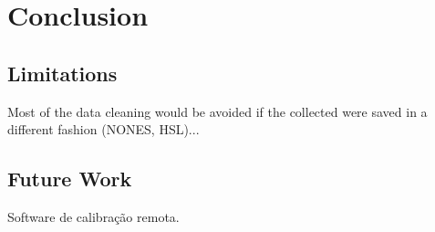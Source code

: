 
\chapter{Conclusion}
\label{chapter:conclusion}

\section{Limitations}
\label{sec:limitations}
Most of the data cleaning would be avoided if the collected were saved in a different fashion (NONES, HSL)...

\section{Future Work}
\label{sec:future_work}
Software de calibração remota.
